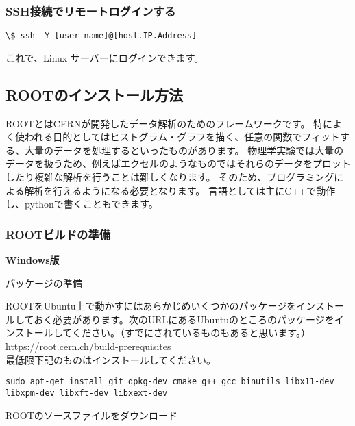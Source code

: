 \documentclass[10pt,a4j]{jarticle}
\begin{document}
\subsubsection{SSH接続でリモートログインする}
\begin{lstlisting}
\$ ssh -Y [user name]@[host.IP.Address]
\end{lstlisting}
これで、Linux サーバーにログインできます。

\subsection{ROOTのインストール方法}

ROOTとはCERNが開発したデータ解析のためのフレームワークです。
特によく使われる目的としてはヒストグラム・グラフを描く、任意の関数でフィットする、大量のデータを処理するといったものがあります。
物理学実験では大量のデータを扱うため、例えばエクセルのようなものではそれらのデータをプロットしたり複雑な解析を行うことは難しくなります。
そのため、プログラミングによる解析を行えるようになる必要となります。
言語としては主にC++で動作し、pythonで書くこともできます。

\subsubsection{ROOTビルドの準備}

\vspace{1cm}
{\large \bf Windows版}
\vspace{0.5cm}

\vspace{0.5cm}
パッケージの準備
\vspace{0.3cm}

ROOTをUbuntu上で動かすにはあらかじめいくつかのパッケージをインストールしておく必要があります。次のURLにあるUbuntuのところのパッケージをインストールしてください。（すでにされているものもあると思います。）\\
\url{https://root.cern.ch/build-prerequisites}\\
最低限下記のものはインストールしてください。
\begin{lstlisting}
sudo apt-get install git dpkg-dev cmake g++ gcc binutils libx11-dev libxpm-dev libxft-dev libxext-dev
\end{lstlisting}

\vspace{0.3cm}
ROOTのソースファイルをダウンロード
\vspace{0.3cm}
\end{document}
